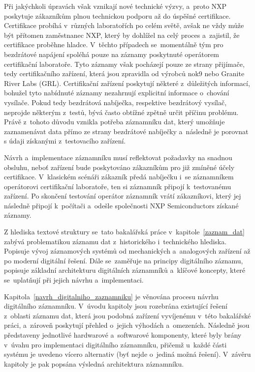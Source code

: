 Při jakýchkoli úpravách však vznikají nové technické výzvy, a~proto NXP poskytuje zákazníkům plnou technickou podporu až do úspěšné certifikace. Certifikace probíhá v~různých laboratořích po celém světě, avšak ne vždy může být přítomen zaměstnanec NXP, který by dohlížel na celý proces a~zajistil, že certifikace proběhne hladce. V~těchto případech se~momentálně tým pro bezdrátové napájení spoléhá pouze na záznamy poskytnuté operátorem certifikační laboratoře. Tyto záznamy však pocházejí pouze ze strany přijímače, tedy certifikačního zařízení, která jsou zpravidla od výrobců nok9 nebo Granite River Labs (GRL). Certifikační zařízení poskytují některé z~důležitých informací, bohužel tyto nabídnuté záznamy nezahrnují explicitní informace o~chování vysílače. Pokud tedy bezdrátová nabíječka, respektive bezdrátový vysílač, neprojde některým z~testů, bývá často obtížné zpětně určit příčinu problému. Právě z~tohoto důvodu vznikla potřeba záznamníku dat, který umožňuje zaznamenávat data přímo ze strany bezdrátové nabíječky a~následně je porovnat s údaji získanými z~testovacího zařízení.~\cite{nxp_wireless_charging_team}

Návrh a~implementace záznamníku musí reflektovat požadavky na snadnou obsluhu, neboť zařízení bude poskytováno zákazníkům pro již zmíněné účely certifikace. V~klasickém scénáři zákazník předá nabíječku i~se záznamníkem operátorovi certifikační laboratoře, ten si záznamník připojí k~testovanému zařízení. Po skončení testování operátor záznamník vrátí zákazníkovi, který jej následně připojí k~počítači a~odešle společnosti NXP Semiconductors získané záznamy.

Z hlediska textové struktury se~tato bakalářská práce v~kapitole~\ref{zaznam_dat} zabývá problematikou záznamu dat z~historického i~technického hlediska. Popisuje vývoj záznamových systémů od mechanických a~analogových zařízení až po moderní digitální řešení. Dále se~zaměřuje na principy digitálního záznamu, popisuje základní architekturu digitálních záznamníků a~klíčové koncepty, které se~uplatňují při jejich návrhu a~implementaci.

Kapitola~\ref{navrh_digitalniho_zaznamniku} je věnována procesu návrhu digitálního záznamníku. V~úvodu kapitoly jsou rozebrána existující řešení z~oblasti záznamu dat, která jsou podobná zařízení vyvíjenému v~této bakalářské práci, a~zároveň poskytují přehled o~jejich výhodách a~omezeních. Následně jsou představeny jednotlivé hardwarové a~softwarové komponenty, které byly brány v~úvahu pro implementaci digitálního záznamníku, přičemž u~každé části systému je uvedeno vícero alternativ (byť nejde o~jediná možná řešení). V~závěru kapitoly je pak popsána výsledná architektura záznamníku.

